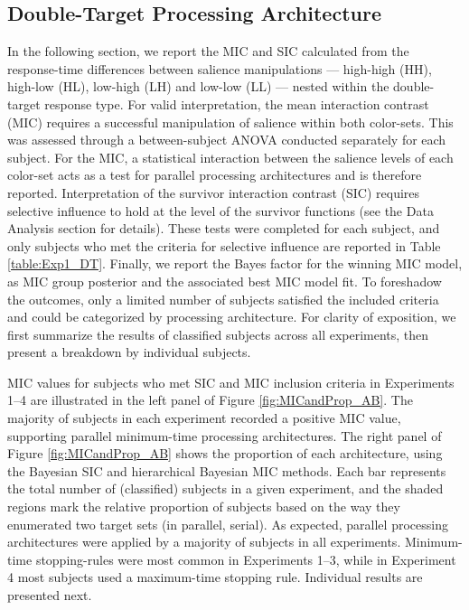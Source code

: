 \subsection{Double-Target Processing Architecture}
In the following section, we report the MIC and SIC calculated from the response-time differences between salience manipulations --- high-high (HH), high-low (HL), low-high (LH) and low-low (LL) --- nested within the double-target response type. For valid interpretation, the mean interaction contrast (MIC) requires a successful manipulation of salience within both color-sets. This was assessed through a between-subject ANOVA conducted separately for each subject. For the MIC, a statistical interaction between the salience levels of each color-set acts as a test for parallel processing architectures and is therefore reported. Interpretation of the survivor interaction contrast (SIC) requires selective influence to hold at the level of the survivor functions (see the Data Analysis section for details). These tests were completed for each subject, and only subjects who met the criteria for selective influence are reported in Table \ref{table:Exp1_DT}. Finally, we report the Bayes factor for the winning MIC model, as MIC group posterior and the associated best MIC model fit. To foreshadow the outcomes, only a limited number of subjects satisfied the included criteria and could be categorized by processing architecture. For clarity of exposition, we first summarize the results of classified subjects across all experiments, then present a breakdown by individual subjects. 

MIC values for subjects who met SIC and MIC inclusion criteria in Experiments 1--4 are illustrated in the left panel of Figure \ref{fig:MICandProp_AB}. The majority of subjects in each experiment recorded a positive MIC value, supporting parallel minimum-time processing architectures. The right panel of Figure \ref{fig:MICandProp_AB} shows the proportion of each architecture, using the Bayesian SIC and hierarchical Bayesian MIC methods. Each bar represents the total number of (classified) subjects in a given experiment, and the shaded regions mark the relative proportion of subjects based on the way they enumerated two target sets (in parallel, serial). As expected, parallel processing architectures were applied by a majority of subjects in all experiments. Minimum-time stopping-rules were most common in Experiments 1--3, while in Experiment 4 most subjects used a maximum-time stopping rule. Individual results are  presented next. 

